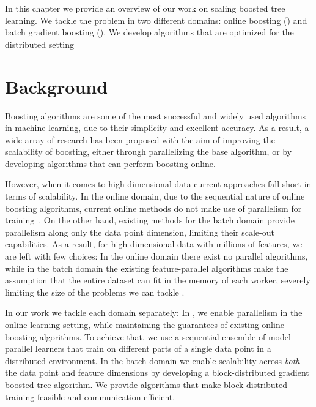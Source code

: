 
In this chapter we provide an overview of our work on scaling boosted tree
learning. We tackle the problem in two different domains: online boosting
(\boostvht) and batch gradient boosting (\blockgbt). We develop algorithms
that are optimized for the distributed setting 

\section{Background}
\label{sec:scalable-boosted-background}

Boosting algorithms are some of the most successful and widely used algorithms
in machine learning, due to their simplicity and excellent accuracy. As a result,
a wide array of research has been proposed with the aim of improving the scalability
of boosting, either through parallelizing the base algorithm, or by developing
algorithms that can perform boosting online.

However, when it comes to high dimensional data current approaches fall short
in terms of scalability.
In the online domain, due to the sequential nature of online boosting algorithms,
current online methods do not make use of parallelism for training~\cite{online-gradient-boosting, Oza2001online, online-boosting-theoretical}.
On the other hand, existing methods for the batch
domain provide parallelism along only the data point dimension, limiting their
scale-out capabilities. As a result, for high-dimensional data with millions
of features, we are left with few choices: In the online domain there exist
no parallel algorithms, while in the batch domain the existing feature-parallel
algorithms make the assumption that the entire dataset can fit in the memory
of each worker, severely limiting the size of the problems we can tackle
\cite{lightgbm, xgboost}.

In our work we tackle each domain separately:
In \boostvht, we enable parallelism in the online learning setting, while maintaining the guarantees of existing
online boosting algorithms. To achieve that, we use a sequential ensemble of model-parallel learners that train
on different parts of a single data point in a distributed environment.
In the batch domain we enable scalability across \emph{both} the data point and
feature dimensions by developing a block-distributed gradient boosted tree algorithm.
We provide algorithms that make block-distributed training feasible and communication-efficient.

